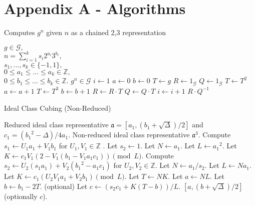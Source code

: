 \documentclass{ucalgthes1}
\theoremstyle{plain}
\theoremstyle{definition}
\newcommand{\ZZ}{\mathbb{Z}}
\begin{document}
\chapter*{Appendix A - Algorithms}

\begin{algorithm}[h]
\caption{Computes $g^n$ given $n$ as a chained 2,3 representation}
\label{alg:expWithChain}
\begin{algorithmic}[1]
\REQUIRE $g \in \mathcal G,$ \\
$n = \sum_{i=1}^k s_i2^{a_i}3^{b_i},$ \\
$s_1,...,s_k \in \{-1, 1\},$ \\
$0 \le a_1 \le ...\le a_k \in \ZZ,$ \\
$0 \le b_1 \le ... \le b_k \in \ZZ.$
\ENSURE $g^n \in \mathcal G$
\STATE $i \gets 1$
\STATE $a \gets 0$ 
\STATE $b \gets 0$ 
\STATE $T \gets g$ 
\STATE $R \gets 1_{\mathcal G}$ 
\STATE $Q \gets 1_{\mathcal G}$ 
		\STATE $T \gets T^2$
		\STATE $a \gets a + 1$
	\ENDWHILE
		\STATE $T \gets T^3$
		\STATE $b \gets b + 1$
	\ENDWHILE
		\STATE $R \gets R \cdot T$
	\ELSE
		\STATE $Q \gets Q \cdot T$
	\ENDIF
	\STATE $i \gets i + 1$
\ENDWHILE
\RETURN $R \cdot Q^{-1}$
\end{algorithmic}
\end{algorithm}

\begin{algorithm}[h]
\caption{Ideal Class Cubing (Non-Reduced)}
\label{alg:idealCube}
\begin{algorithmic}[1]
\REQUIRE Reduced ideal class representative $\mathfrak a = \left[a_1, (b_1 + \sqrt\Delta)/2\right]$ and $c_1 = ({b_1}^2-\Delta)/4a_1$.
\ENSURE Non-reduced ideal class representative ${\mathfrak a}^3$.
\STATE Compute $s_1 \leftarrow U_1a_1 + V_1b_1$ for $U_1,V_1 \in \ZZ$ .
	\STATE Let $s_2 \leftarrow 1$.
	\STATE Let $N \leftarrow a_1$.
	\STATE Let $L \leftarrow {a_1}^2$.
	\STATE Let $K \leftarrow c_1V_1(2-V_1(b_1-V_1a_1c_1)) \pmod L$.
\ELSE
	\STATE Compute $s_2 \leftarrow U_2(s_1a_1) + V_2({b_1}^2-a_1c_1)$ for $U_2, V_2 \in \ZZ$.
	\STATE Let $N \leftarrow a_1/s_2$.
	\STATE Let $L \leftarrow Na_1$.
	\STATE Let $K \leftarrow c_1(U_2V_1a_1+V_2b_1) \pmod L$.
\ENDIF
\STATE Let $T \leftarrow NK$.
\STATE Let $a \leftarrow NL$.
\STATE Let $b \leftarrow b_1 - 2T$.
\STATE (optional) Let $c \leftarrow (s_2c_1+K(T-b))/L$.
\RETURN $[a, (b+\sqrt\Delta)/2]$ (optionally $c$).
\end{algorithmic}
\end{algorithm}
\end{document}
